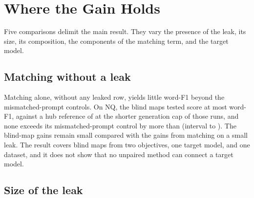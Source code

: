 \section{Where the Gain Holds}\label{sec:attack:ablations}\label{sec:attack:negative}

Five comparisons delimit the main result.
They vary the presence of the leak, its size, its composition, the components of the matching term, and the target model.

\subsection{Matching without a leak}\label{sec:attack:blind}

Matching alone, without any leaked row, yields little word-F1 beyond the mismatched-prompt controls.
On NQ, the blind maps tested score at most  word-F1, against a hub reference of  at the shorter generation cap of those runs, and none exceeds its mismatched-prompt control by more than  (interval  to ). %
The blind-map gains remain small compared with the gains from matching on a small leak.
The result covers  blind maps from two objectives, one target model, and one dataset, and it does not show that no unpaired method can connect a target model. %

\subsection{Size of the leak}\label{sec:attack:budget}


